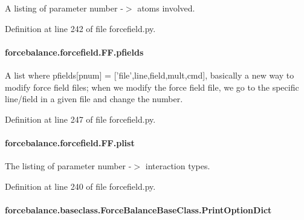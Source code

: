 A listing of parameter number -\/$>$ atoms involved. 



Definition at line 242 of file forcefield.\-py.

\hypertarget{classforcebalance_1_1forcefield_1_1FF_a8f5c9c11cd2f164a2ff6e310c1bc79f1}{
\paragraph[{pfields}]{\setlength{\rightskip}{0pt plus 5cm}forcebalance.\-forcefield.\-F\-F.\-pfields}}\label{classforcebalance_1_1forcefield_1_1FF_a8f5c9c11cd2f164a2ff6e310c1bc79f1}


A list where pfields\mbox{[}pnum\mbox{]} = \mbox{[}'file',line,field,mult,cmd\mbox{]}, basically a new way to modify force field files; when we modify the force field file, we go to the specific line/field in a given file and change the number. 



Definition at line 247 of file forcefield.\-py.

\hypertarget{classforcebalance_1_1forcefield_1_1FF_a72d2a63abbeae0b783a1e3e4077b3ab1}{
\paragraph[{plist}]{\setlength{\rightskip}{0pt plus 5cm}forcebalance.\-forcefield.\-F\-F.\-plist}}\label{classforcebalance_1_1forcefield_1_1FF_a72d2a63abbeae0b783a1e3e4077b3ab1}


The listing of parameter number -\/$>$ interaction types. 



Definition at line 240 of file forcefield.\-py.

\hypertarget{classforcebalance_1_1baseclass_1_1ForceBalanceBaseClass_a5c55e661e746d1a4443f4e0bc34ebe05}{
\paragraph[{Print\-Option\-Dict}]{\setlength{\rightskip}{0pt plus 5cm}forcebalance.\-baseclass.\-Force\-Balance\-Base\-Class.\-Print\-Option\-Dict\hspace{0.3cm}{\ttfamily [inherited]}}}\label{classforcebalance_1_1baseclass_1_1ForceBalanceBaseClass_a5c55e661e746d1a4443f4e0bc34ebe05}


